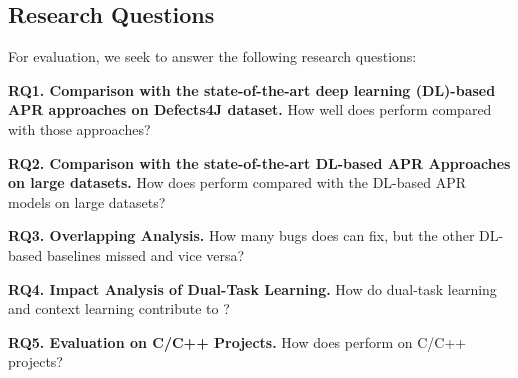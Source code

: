 \subsection{Research Questions}

For evaluation, we seek to answer the following research questions:

\noindent\textbf{RQ1. Comparison with the state-of-the-art deep learning
  (DL)-based APR approaches on Defects4J dataset.}  How well does
                {\tool} perform compared with those approaches?



\noindent\textbf{RQ2. Comparison with the state-of-the-art DL-based APR Approaches on large datasets.}  
How does {\tool} perform compared with the DL-based APR models on large datasets?


\noindent\textbf{RQ3. Overlapping Analysis.} How many bugs does
{\tool} can fix, but the other DL-based baselines
                missed and vice versa?

\noindent\textbf{RQ4. Impact Analysis of Dual-Task Learning.} How do
dual-task learning and context learning contribute to {\tool}?


\noindent\textbf{RQ5. Evaluation on C/C++ Projects.} How does {\tool} perform on C/C++ projects?

